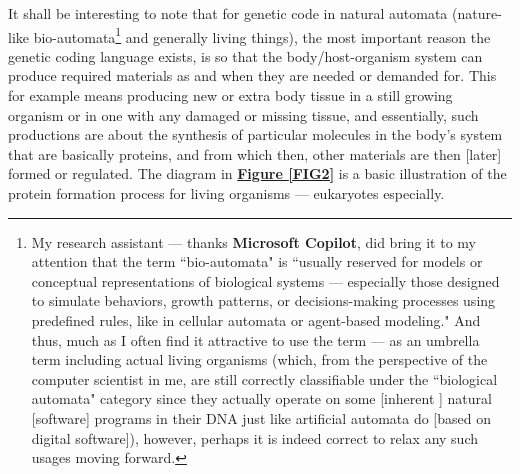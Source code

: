 \documentclass[a4paper, 18pt]{book} %
\begin{document}
It shall be interesting to note that for genetic code in natural automata (nature-like bio-automata\footnote{My research assistant --- thanks \textbf{Microsoft Copilot}, did bring it to my attention that the term ``bio-automata" is ``usually reserved for models or conceptual representations of biological systems --- especially those designed to simulate behaviors, growth patterns, or decisions-making processes using predefined rules, like in cellular automata or agent-based modeling." And thus, much as I often find it attractive to use the term --- as an umbrella term including actual living organisms (which, from the perspective of the computer scientist in me, are still correctly classifiable under the ``biological automata" category since they actually operate on some [inherent ] natural [software] programs in their DNA just like artificial automata do [based on digital software]), however, perhaps it is indeed correct to relax any such usages moving forward.} and generally living things), the most important reason the genetic coding language exists, is so that the body/host-organism system can produce required materials as and when they are needed or demanded for. This for example means producing new or extra body tissue in a still growing organism or in one with any damaged or missing tissue, and essentially, such productions are about the synthesis of particular molecules in the body's system that are basically proteins, and from which then, other materials are then [later] formed or regulated. The diagram in \textbf{\hyperref[FIG2]{Figure \ref{FIG2}}} is a basic illustration of the protein formation process for living organisms --- eukaryotes especially.
    
\end{document}
